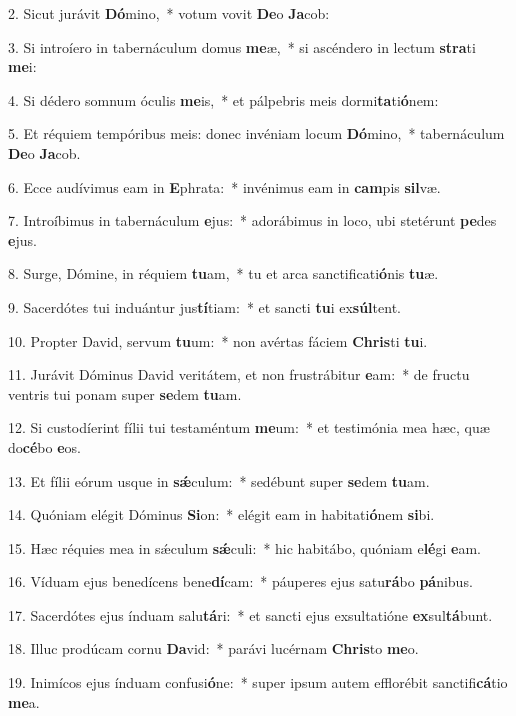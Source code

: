 2. Sicut jurávit \textbf{Dó}mino,~*  votum vovit \textbf{De}o \textbf{Ja}cob:\

3. Si introíero in tabernáculum domus \textbf{me}æ,~*  si ascéndero in lectum \textbf{stra}ti \textbf{me}i:\

4. Si dédero somnum óculis \textbf{me}is,~*  et pálpebris meis dormi\textbf{ta}ti\textbf{ó}nem:\

5. Et réquiem tempóribus meis: donec invéniam locum \textbf{Dó}mino,~*  tabernáculum \textbf{De}o \textbf{Ja}cob.\

6. Ecce audívimus eam in \textbf{E}phrata:~*  invénimus eam in \textbf{cam}pis \textbf{sil}væ.\

7. Introíbimus in tabernáculum \textbf{e}jus:~*  adorábimus in loco, ubi stetérunt \textbf{pe}des \textbf{e}jus.\

8. Surge, Dómine, in réquiem \textbf{tu}am,~*  tu et arca sanctificati\textbf{ó}nis \textbf{tu}æ.\

9. Sacerdótes tui induántur jus\textbf{tí}tiam:~*  et sancti \textbf{tu}i ex\textbf{súl}tent.\

10. Propter David, servum \textbf{tu}um:~*  non avértas fáciem \textbf{Chris}ti \textbf{tu}i.\

11. Jurávit Dóminus David veritátem, et non frustrábitur \textbf{e}am:~*  de fructu ventris tui ponam super \textbf{se}dem \textbf{tu}am.\

12. Si custodíerint fílii tui testaméntum \textbf{me}um:~*  et testimónia mea hæc, quæ do\textbf{cé}bo \textbf{e}os.\

13. Et fílii eórum usque in \textbf{sǽ}culum:~*  sedébunt super \textbf{se}dem \textbf{tu}am.\

14. Quóniam elégit Dóminus \textbf{Si}on:~*  elégit eam in habitati\textbf{ó}nem \textbf{si}bi.\

15. Hæc réquies mea in sǽculum \textbf{sǽ}culi:~*  hic habitábo, quóniam e\textbf{lé}gi \textbf{e}am.\

16. Víduam ejus benedícens bene\textbf{dí}cam:~*  páuperes ejus satu\textbf{rá}bo \textbf{pá}nibus.\

17. Sacerdótes ejus índuam salu\textbf{tá}ri:~*  et sancti ejus exsultatióne \textbf{ex}sul\textbf{tá}bunt.\

18. Illuc prodúcam cornu \textbf{Da}vid:~*  parávi lucérnam \textbf{Chris}to \textbf{me}o.\

19. Inimícos ejus índuam confusi\textbf{ó}ne:~*  super ipsum autem efflorébit sanctifi\textbf{cá}tio \textbf{me}a.\

